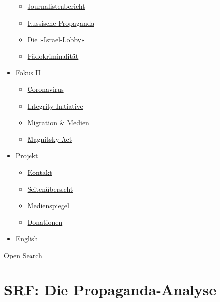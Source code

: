 \begin{itemize}
  \begin{itemize}
  \tightlist
  \item
    \href{https://swprs.org/bericht-eines-journalisten/}{Journalistenbericht}
  \item
    \href{https://swprs.org/russische-propaganda/}{Russische Propaganda}
  \item
    \href{https://swprs.org/die-israel-lobby-fakten-und-mythen/}{Die
    »Israel-Lobby«}
  \item
    \href{https://swprs.org/geopolitik-und-paedokriminalitaet/}{Pädokriminalität}
  \end{itemize}
\item
  \href{https://swprs.org/migration-und-medien/}{Fokus II}

  \begin{itemize}
  \tightlist
  \item
    \href{https://swprs.org/covid-19-hinweis-ii/}{Coronavirus}
  \item
    \href{https://swprs.org/die-integrity-initiative/}{Integrity
    Initiative}
  \item
    \href{https://swprs.org/migration-und-medien/}{Migration \& Medien}
  \item
    \href{https://swprs.org/der-fall-magnitsky/}{Magnitsky Act}
  \end{itemize}
\item
  \href{https://swprs.org/kontakt/}{Projekt}

  \begin{itemize}
  \tightlist
  \item
    \href{https://swprs.org/kontakt/}{Kontakt}
  \item
    \href{https://swprs.org/uebersicht/}{Seitenübersicht}
  \item
    \href{https://swprs.org/medienspiegel/}{Medienspiegel}
  \item
    \href{https://swprs.org/donationen/}{Donationen}
  \end{itemize}
\item
  \href{https://swprs.org/contact/}{English}
\end{itemize}

\protect\hyperlink{}{Open Search}

\hypertarget{srf-die-propaganda-analyse}{%
\section{SRF: Die Propaganda-Analyse}\label{srf-die-propaganda-analyse}}

